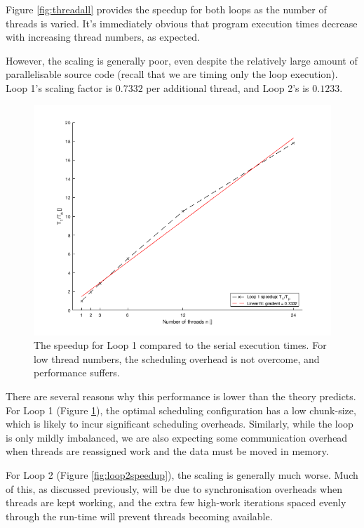 \documentclass{article} %
\begin{document}
Figure \ref{fig:threadall} provides the speedup for both loops as the number of threads is varied.
It's immediately obvious that program execution times decrease with increasing thread numbers, as expected.

However, the scaling is generally poor, even despite the relatively large amount of parallelisable source code (recall that we are timing only the loop execution).
Loop 1's scaling factor is $0.7332$ per additional thread, and Loop 2's is $0.1233$. 

\begin{figure}
    \centering
    \includegraphics[height=.35\textheight]{part1_plots/loop1_speedup.png}
    \caption{The speedup for Loop 1 compared to the serial execution times. For low thread numbers, the scheduling overhead is not overcome, and performance suffers.}
    \label{fig:loop1speedup}
\end{figure}

There are several reasons why this performance is lower than the theory predicts. 
For Loop 1 (Figure \ref{fig:loop1speedup}), the optimal scheduling configuration has a low chunk-size, which is likely to incur significant scheduling overheads.
Similarly, while the loop is only mildly imbalanced, we are also expecting some communication overhead when threads are reassigned work and the data must be moved in memory.

For Loop 2 (Figure \ref{fig:loop2speedup}), the scaling is generally much worse.
Much of this, as discussed previously, will be due to synchronisation overheads when threads are kept working, and the extra few high-work iterations spaced evenly through the run-time will prevent threads becoming available.
\end{document}
